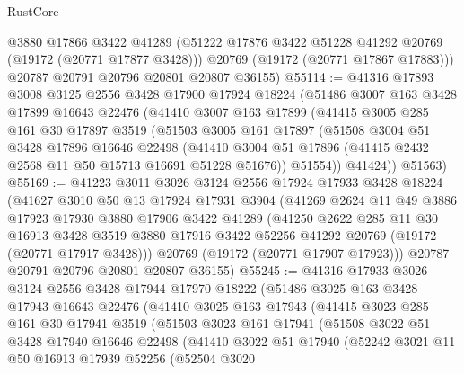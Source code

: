 \begin{lexlean}{RustCore}
\begin{coremodule}
        @3880
        @17866
        @3422
        @41289
        (@51222 @17876 @3422 @51228 @41292 @20769 (@19172 (@20771 @17877 @3428)))
        @20769
        (@19172 (@20771 @17867 @17883)))
      @20787
      @20791
      @20796
      @20801
      @20807
      @36155)
@55114 := @41316
    @17893
    @3008
    @3125
    @2556
    @3428
    @17900
    @17924
    @18224
    (@51486
      @3007
      @163
      @3428
      @17899
      @16643
      @22476
      (@41410
        @3007
        @163
        @17899
        (@41415
          @3005
          @285
          @161
          @30
          @17897
          @3519
          (@51503
            @3005
            @161
            @17897
            (@51508
              @3004
              @51
              @3428
              @17896
              @16646
              @22498
              (@41410 @3004 @51 @17896 (@41415 @2432 @2568 @11 @50 @15713 @16691 @51228 @51676))
              @51554))
          @41424))
      @51563)
@55169 := @41223
    @3011
    @3026
    @3124
    @2556
    @17924
    @17933
    @3428
    @18224
    (@41627
      @3010
      @50
      @13
      @17924
      @17931
      @3904
      (@41269
        @2624
        @11
        @49
        @3886
        @17923
        @17930
        @3880
        @17906
        @3422
        @41289
        (@41250
          @2622
          @285
          @11
          @30
          @16913
          @3428
          @3519
          @3880
          @17916
          @3422
          @52256
          @41292
          @20769
          (@19172 (@20771 @17917 @3428)))
        @20769
        (@19172 (@20771 @17907 @17923)))
      @20787
      @20791
      @20796
      @20801
      @20807
      @36155)
@55245 := @41316
    @17933
    @3026
    @3124
    @2556
    @3428
    @17944
    @17970
    @18222
    (@51486
      @3025
      @163
      @3428
      @17943
      @16643
      @22476
      (@41410
        @3025
        @163
        @17943
        (@41415
          @3023
          @285
          @161
          @30
          @17941
          @3519
          (@51503
            @3023
            @161
            @17941
            (@51508
              @3022
              @51
              @3428
              @17940
              @16646
              @22498
              (@41410
                @3022
                @51
                @17940
                (@52242
                  @3021
                  @11
                  @50
                  @16913
                  @17939
                  @52256
                  (@52504
                    @3020

\end{coremodule}
\end{lexlean}
